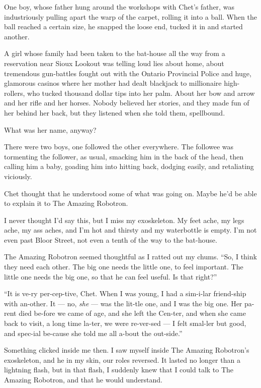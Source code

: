 One boy, whose father hung around the workshops with Chet's father,
was industriously pulling apart the warp of the carpet, rolling it
into a ball. When the ball reached a certain size, he snapped the
loose end, tucked it in and started another.

A girl whose family had been taken to the bat-house all the way
from a reservation near Sioux Lookout was telling loud lies about
home, about tremendous gun-battles fought out with the Ontario
Provincial Police and huge, glamorous casinos where her mother had
dealt blackjack to millionaire high-rollers, who tucked thousand
dollar tips into her palm. About her bow and arrow and her rifle
and her horses. Nobody believed her stories, and they made fun of
her behind her back, but they listened when she told them,
spellbound.

What was her name, anyway?

There were two boys, one followed the other everywhere. The
followee was tormenting the follower, as usual, smacking him in the
back of the head, then calling him a baby, goading him into hitting
back, dodging easily, and retaliating viciously.

Chet thought that he understood some of what was going on. Maybe
he'd be able to explain it to The Amazing Robotron.

\tb

I never thought I'd say this, but I miss my exoskeleton. My feet
ache, my legs ache, my ass aches, and I'm hot and thirsty and my
waterbottle is empty. I'm not even past Bloor Street, not even a
tenth of the way to the bat-house.

\tb

The Amazing Robotron seemed thoughtful as I ratted out my chums.
``So, I think they need each other. The big one needs the little one, to feel 
important. The little one needs the big one, so that he can feel useful. Is 
that right?''

``It is ve-ry per-cep-tive, Chet. When I was young, I had a sim-i-lar 
friend-ship with an-other. It --- no, \emph{she} --- was the lit-tle one, and I 
was the big one. Her pa-rent died be-fore we came of age, and she left the 
Cen-ter, and when she came back to visit, a long time la-ter, we were 
re-ver-sed --- I felt smal-ler but good, and spec-ial be-cause she told me all 
a-bout the out-side.''

Something clicked inside me then. I saw myself inside The Amazing
Robotron's exoskeleton, and he in my skin, our roles reversed. It
lasted no longer than a lightning flash, but in that flash, I
suddenly knew that I could talk to The Amazing Robotron, and that
he would understand.

